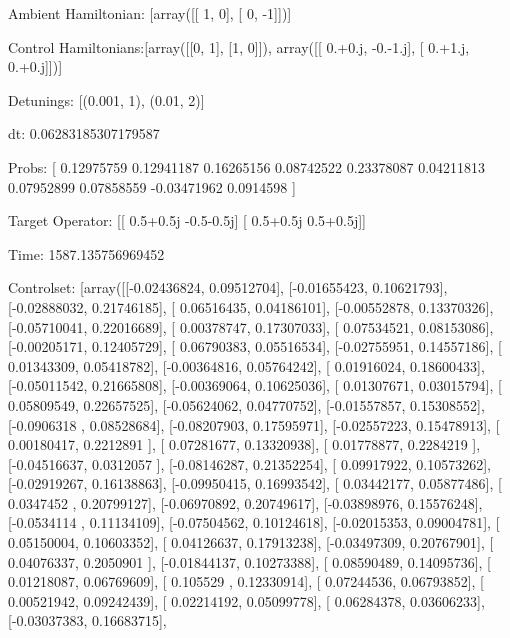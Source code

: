 \documentclass{article}
\begin{document}
    

\newpage

Ambient Hamiltonian: [array([[ 1,  0],
       [ 0, -1]])]

Control Hamiltonians:[array([[0, 1],
       [1, 0]]), array([[ 0.+0.j, -0.-1.j],
       [ 0.+1.j,  0.+0.j]])]

Detunings: [(0.001, 1), (0.01, 2)]

 dt: 0.06283185307179587

Probs: [ 0.12975759  0.12941187  0.16265156  0.08742522  0.23378087  0.04211813
  0.07952899  0.07858559 -0.03471962  0.0914598 ]

Target Operator: [[ 0.5+0.5j -0.5-0.5j]
 [ 0.5+0.5j  0.5+0.5j]]

Time: 1587.135756969452

Controlset: [array([[-0.02436824,  0.09512704],
       [-0.01655423,  0.10621793],
       [-0.02888032,  0.21746185],
       [ 0.06516435,  0.04186101],
       [-0.00552878,  0.13370326],
       [-0.05710041,  0.22016689],
       [ 0.00378747,  0.17307033],
       [ 0.07534521,  0.08153086],
       [-0.00205171,  0.12405729],
       [ 0.06790383,  0.05516534],
       [-0.02755951,  0.14557186],
       [ 0.01343309,  0.05418782],
       [-0.00364816,  0.05764242],
       [ 0.01916024,  0.18600433],
       [-0.05011542,  0.21665808],
       [-0.00369064,  0.10625036],
       [ 0.01307671,  0.03015794],
       [ 0.05809549,  0.22657525],
       [-0.05624062,  0.04770752],
       [-0.01557857,  0.15308552],
       [-0.0906318 ,  0.08528684],
       [-0.08207903,  0.17595971],
       [-0.02557223,  0.15478913],
       [ 0.00180417,  0.2212891 ],
       [ 0.07281677,  0.13320938],
       [ 0.01778877,  0.2284219 ],
       [-0.04516637,  0.0312057 ],
       [-0.08146287,  0.21352254],
       [ 0.09917922,  0.10573262],
       [-0.02919267,  0.16138863],
       [-0.09950415,  0.16993542],
       [ 0.03442177,  0.05877486],
       [ 0.0347452 ,  0.20799127],
       [-0.06970892,  0.20749617],
       [-0.03898976,  0.15576248],
       [-0.0534114 ,  0.11134109],
       [-0.07504562,  0.10124618],
       [-0.02015353,  0.09004781],
       [ 0.05150004,  0.10603352],
       [ 0.04126637,  0.17913238],
       [-0.03497309,  0.20767901],
       [ 0.04076337,  0.2050901 ],
       [-0.01844137,  0.10273388],
       [ 0.08590489,  0.14095736],
       [ 0.01218087,  0.06769609],
       [ 0.105529  ,  0.12330914],
       [ 0.07244536,  0.06793852],
       [ 0.00521942,  0.09242439],
       [ 0.02214192,  0.05099778],
       [ 0.06284378,  0.03606233],
       [-0.03037383,  0.16683715],
\end{document}
